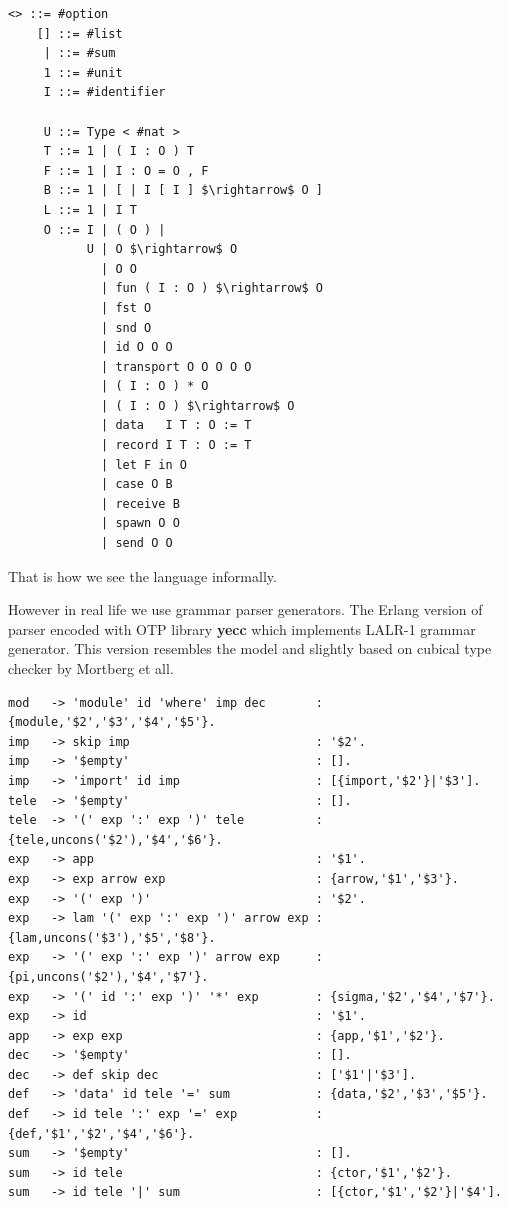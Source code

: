 \documentclass[11pt,oneside]{article}
\begin{document}
\begin{lstlisting}[mathescape=true]
    <> ::= #option
    [] ::= #list
     | ::= #sum
     1 ::= #unit
     I ::= #identifier

     U ::= Type < #nat >
     T ::= 1 | ( I : O ) T
     F ::= 1 | I : O = O , F
     B ::= 1 | [ | I [ I ] $\rightarrow$ O ]
     L ::= 1 | I T
     O ::= I | ( O ) |
           U | O $\rightarrow$ O
             | O O
             | fun ( I : O ) $\rightarrow$ O
             | fst O
             | snd O
             | id O O O
             | transport O O O O O
             | ( I : O ) * O
             | ( I : O ) $\rightarrow$ O
             | data   I T : O := T
             | record I T : O := T
             | let F in O
             | case O B
             | receive B
             | spawn O O
             | send O O
\end{lstlisting}

That is how we see the language informally.

\newpage

However in real life we use grammar parser generators.
The Erlang version of parser encoded with OTP library {\bf yecc} which implements
LALR-1 grammar generator. This version resembles the model and slightly based on cubical
type checker by Mortberg et all.

\begin{lstlisting}
mod   -> 'module' id 'where' imp dec       : {module,'$2','$3','$4','$5'}.
imp   -> skip imp                          : '$2'.
imp   -> '$empty'                          : [].
imp   -> 'import' id imp                   : [{import,'$2'}|'$3'].
tele  -> '$empty'                          : [].
tele  -> '(' exp ':' exp ')' tele          : {tele,uncons('$2'),'$4','$6'}.
exp   -> app                               : '$1'.
exp   -> exp arrow exp                     : {arrow,'$1','$3'}.
exp   -> '(' exp ')'                       : '$2'.
exp   -> lam '(' exp ':' exp ')' arrow exp : {lam,uncons('$3'),'$5','$8'}.
exp   -> '(' exp ':' exp ')' arrow exp     : {pi,uncons('$2'),'$4','$7'}.
exp   -> '(' id ':' exp ')' '*' exp        : {sigma,'$2','$4','$7'}.
exp   -> id                                : '$1'.
app   -> exp exp                           : {app,'$1','$2'}.
dec   -> '$empty'                          : [].
dec   -> def skip dec                      : ['$1'|'$3'].
def   -> 'data' id tele '=' sum            : {data,'$2','$3','$5'}.
def   -> id tele ':' exp '=' exp           : {def,'$1','$2','$4','$6'}.
sum   -> '$empty'                          : [].
sum   -> id tele                           : {ctor,'$1','$2'}.
sum   -> id tele '|' sum                   : [{ctor,'$1','$2'}|'$4'].
\end{lstlisting}
\end{document}
